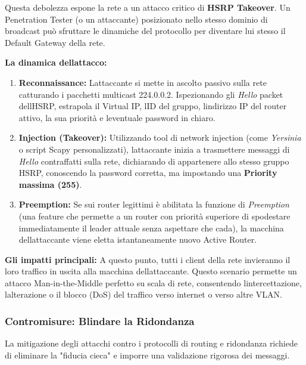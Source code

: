 \documentclass[11pt,a4paper]{article}
\begin{document}
Questa debolezza espone la rete a un attacco critico di \textbf{HSRP
Takeover}. Un Penetration Tester (o un attaccante) posizionato nello
stesso dominio di broadcast può sfruttare le dinamiche del protocollo
per diventare lui stesso il Default Gateway della rete.

\textbf{La dinamica dell\textquotesingle attacco:}

\begin{enumerate}
\def\labelenumi{\arabic{enumi}.}
\item
  \textbf{Reconnaissance:} L\textquotesingle attaccante si mette in
  ascolto passivo sulla rete catturando i pacchetti multicast 224.0.0.2.
  Ispezionando gli \emph{Hello} packet dell\textquotesingle HSRP,
  estrapola il Virtual IP, l\textquotesingle ID del gruppo,
  l\textquotesingle indirizzo IP del router attivo, la sua priorità e
  l\textquotesingle eventuale password in chiaro.
\item
  \textbf{Injection (Takeover):} Utilizzando tool di network injection
  (come \emph{Yersinia} o script Scapy personalizzati),
  l\textquotesingle attaccante inizia a trasmettere messaggi di
  \emph{Hello} contraffatti sulla rete, dichiarando di appartenere allo
  stesso gruppo HSRP, conoscendo la password corretta, ma impostando una
  \textbf{Priority massima (255)}.
\item
  \textbf{Preemption:} Se sui router legittimi è abilitata la funzione
  di \emph{Preemption} (una feature che permette a un router con
  priorità superiore di spodestare immediatamente il leader attuale
  senza aspettare che cada), la macchina dell\textquotesingle attaccante
  viene eletta istantaneamente nuovo Active Router.
\end{enumerate}

\textbf{Gli impatti principali:} A questo punto, tutti i client della
rete invieranno il loro traffico in uscita alla macchina
dell\textquotesingle attaccante. Questo scenario permette un attacco
Man-in-the-Middle perfetto su scala di rete, consentendo
l\textquotesingle intercettazione, l\textquotesingle alterazione o il
blocco (DoS) del traffico verso internet o verso altre VLAN.

\subsubsection{Contromisure: Blindare la
Ridondanza}\label{contromisure-blindare-la-ridondanza}

La mitigazione degli attacchi contro i protocolli di routing e
ridondanza richiede di eliminare la "fiducia cieca" e imporre una
validazione rigorosa dei messaggi.
\end{document}
